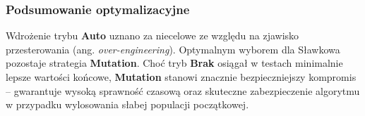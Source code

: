 \subsubsection{Podsumowanie optymalizacyjne}
Wdrożenie trybu \textbf{Auto} uznano za niecelowe ze względu na zjawisko przesterowania (ang. \textit{over-engineering}). Optymalnym wyborem dla Sławkowa pozostaje strategia \textbf{Mutation}. Choć tryb \textbf{Brak} osiągał w testach minimalnie lepsze wartości końcowe, \textbf{Mutation} stanowi znacznie bezpieczniejszy kompromis – gwarantuje wysoką sprawność czasową oraz skuteczne zabezpieczenie algorytmu w przypadku wylosowania słabej populacji początkowej.


